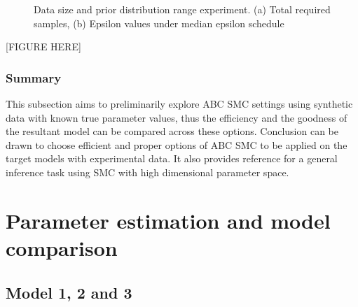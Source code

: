 \documentclass[12pt,a4paper]{report}
\begin{document}
\begin{figure}
    \begin{center}
    \end{center}

    \caption[Data size and prior distribution range experiment]%
    {Data size and prior distribution range experiment. (a) Total required samples, (b) Epsilon values under median epsilon schedule}
    \label{fig:size}

\end{figure}

[FIGURE HERE]


\subsubsection{Summary} This subsection aims to preliminarily explore ABC SMC settings using synthetic data with known true parameter values, thus the efficiency and the goodness of the resultant model can be compared across these options. Conclusion can be drawn to choose efficient and proper options of ABC SMC to be applied on the target models with experimental data. It also provides reference for a general inference task using SMC with high dimensional parameter space.








\section{Parameter estimation and model comparison}

\subsection{Model 1, 2 and 3}
\end{document}
